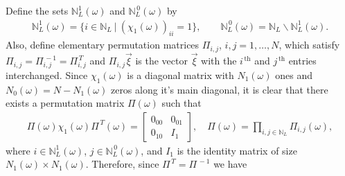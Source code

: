\documentclass{cmslatex}
\begin{document}
Define the sets $\mathbb{N}_L^1(\omega)$ and $\mathbb{N}_L^{\,0}(\omega)$ by
%
\begin{align}\label{eq:Zero_One_indices}
  \mathbb{N}_L^1(\omega)=\{i\in\mathbb{N}_L \ | \ (\chi_1(\omega))_{ii}=1\}, \qquad
  \mathbb{N}_L^{\,0}(\omega)=\mathbb{N}_L\backslash \mathbb{N}_L^1(\omega).
\end{align}
%
Also, define elementary permutation matrices \cite{Demmel:1997} $\Pi_{i,j}$,
$i,j=1,\ldots,N$, which satisfy $\Pi_{i,j}=\Pi_{i,j}^{\,-1}=\Pi_{i,j}^{\,T}$ and
$\Pi_{i,j}\vec{\xi}$ is the vector $\vec{\xi}$ with the $i^{\,\text{th}}$
and $j^{\,\text{th}}$ entries interchanged. Since $\chi_1(\omega)$ is a
diagonal matrix with $N_1(\omega)$ ones and $N_0(\omega)=N-N_1(\omega)$ zeros along it's main
diagonal, it is clear that there exists a permutation matrix $\Pi(\omega)$
such that
%
\begin{align}\label{eq:chi_Perm}
  \Pi(\omega)\chi_1(\omega)\Pi^{\,T}(\omega)=
  \left[
  \begin{array}{ccc}
    0_{00}&0_{01}\\
    0_{10}&I_1   
    \end{array}
\right],
\quad
\Pi(\omega)=\prod_{i,j\in\mathbb{N}_L}\Pi_{i,j}(\omega),
\end{align}
%
where $i\in\mathbb{N}_L^1(\omega)$, $j\in\mathbb{N}_L^{\,0}(\omega)$,
and $I_1$ is the identity matrix of size $N_1(\omega)\times N_1(\omega)$. Therefore,
since  $\Pi^{\,T}=\Pi^{\,-1}$ we have
%
\end{document}
